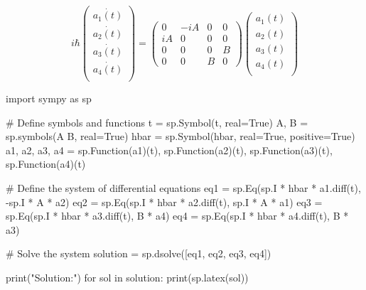 \documentclass[]{article}
\newenvironment{Shaded}{\begin{snugshade}}{\end{snugshade}}
\newcommand{\NormalTok}[1]{#1}
\begin{document}
\[
i\hbar \begin{pmatrix}
\dot{a_{1}(t)} \\
\dot{a_{2}(t) }\\ 
\dot{a_{3}(t) }\\ 
\dot{a_{4}(t)} \\
\end{pmatrix} =  \begin{pmatrix}
0 & -iA & 0 & 0 \\
iA & 0 & 0 & 0 \\
0 & 0 & 0 & B \\
0 & 0 & B & 0
\end{pmatrix} \begin{pmatrix}
a_{1}(t) \\
a_{2}(t) \\ 
a_{3}(t) \\ 
a_{4}(t) \\
\end{pmatrix}
\]

\begin{Shaded}
\begin{Highlighting}[]
\NormalTok{import sympy as sp}

\NormalTok{\# Define symbols and functions}
\NormalTok{t = sp.Symbol(\textquotesingle{}t\textquotesingle{}, real=True)}
\NormalTok{A, B = sp.symbols(\textquotesingle{}A B\textquotesingle{}, real=True)}
\NormalTok{hbar = sp.Symbol(\textquotesingle{}hbar\textquotesingle{}, real=True, positive=True)}
\NormalTok{a1, a2, a3, a4 = sp.Function(\textquotesingle{}a1\textquotesingle{})(t), sp.Function(\textquotesingle{}a2\textquotesingle{})(t), sp.Function(\textquotesingle{}a3\textquotesingle{})(t), sp.Function(\textquotesingle{}a4\textquotesingle{})(t)}

\NormalTok{\# Define the system of differential equations}
\NormalTok{eq1 = sp.Eq(sp.I * hbar * a1.diff(t), {-}sp.I * A * a2)}
\NormalTok{eq2 = sp.Eq(sp.I * hbar * a2.diff(t), sp.I * A * a1)}
\NormalTok{eq3 = sp.Eq(sp.I * hbar * a3.diff(t), B * a4)}
\NormalTok{eq4 = sp.Eq(sp.I * hbar * a4.diff(t), B * a3)}

\NormalTok{\# Solve the system}
\NormalTok{solution = sp.dsolve([eq1, eq2, eq3, eq4])}

\NormalTok{print("Solution:")}
\NormalTok{for sol in solution:}
\NormalTok{    print(sp.latex(sol))}
\end{Highlighting}
\end{Shaded}
\end{document}
